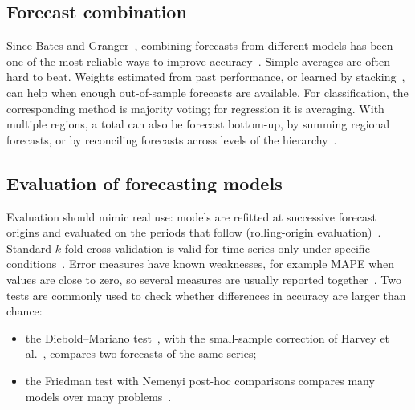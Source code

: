 \documentclass[conference]{IEEEtran}
\begin{document}
\subsection{Forecast combination}
Since Bates and Granger~\cite{bates1969combination}, combining forecasts from different models has been one of the most reliable ways to improve accuracy~\cite{clemen1989combining,wang2023combinations}.
Simple averages are often hard to beat.
Weights estimated from past performance, or learned by stacking~\cite{wolpert1992stacked}, can help when enough out-of-sample forecasts are available.
For classification, the corresponding method is majority voting; for regression it is averaging.
With multiple regions, a total can also be forecast bottom-up, by summing regional forecasts, or by reconciling forecasts across levels of the hierarchy~\cite{hyndman2011hierarchical,wickramasuriya2019mint}.

\subsection{Evaluation of forecasting models}
Evaluation should mimic real use: models are refitted at successive forecast origins and evaluated on the periods that follow (rolling-origin evaluation)~\cite{tashman2000outofsample}.
Standard $k$-fold cross-validation is valid for time series only under specific conditions~\cite{bergmeir2012cv,bergmeir2018cv}.
Error measures have known weaknesses, for example MAPE when values are close to zero, so several measures are usually reported together~\cite{hyndman2006measures}.
Two tests are commonly used to check whether differences in accuracy are larger than chance:
\begin{itemize}
\item the Diebold--Mariano test~\cite{diebold1995dm}, with the small-sample correction of Harvey et al.~\cite{harvey1997hln}, compares two forecasts of the same series;
\item the Friedman test with Nemenyi post-hoc comparisons compares many models over many problems~\cite{demsar2006statistical}.
\end{itemize}
\end{document}
